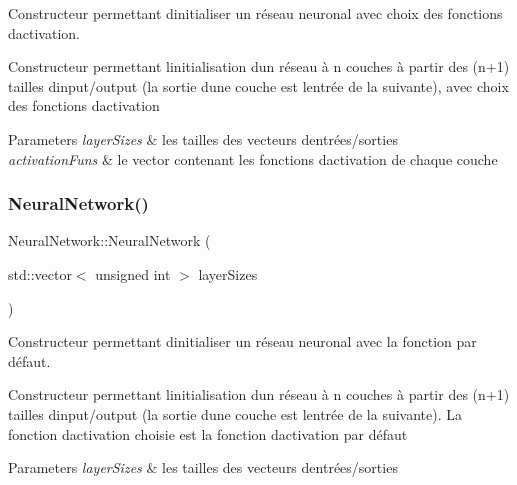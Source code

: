 Constructeur permettant d\textquotesingle{}initialiser un réseau neuronal avec choix des fonctions d\textquotesingle{}activation. 

Constructeur permettant l\textquotesingle{}initialisation d\textquotesingle{}un réseau à n couches à partir des (n+1) tailles d\textquotesingle{}input/output (la sortie d\textquotesingle{}une couche est l\textquotesingle{}entrée de la suivante), avec choix des fonctions d\textquotesingle{}activation 
\begin{DoxyParams}{Parameters}
{\em layer\+Sizes} & les tailles des vecteurs d\textquotesingle{}entrées/sorties \\
\hline
{\em activation\+Funs} & le vector contenant les fonctions d\textquotesingle{}activation de chaque couche \\
\hline
\end{DoxyParams}
\mbox{\label{classNeuralNetwork_ab4015471a72a3d00b6bcabf156526f7b}} 
\subsubsection{\texorpdfstring{Neural\+Network()}{NeuralNetwork()}\hspace{0.1cm}{\footnotesize\ttfamily [3/4]}}
{\footnotesize\ttfamily Neural\+Network\+::\+Neural\+Network (\begin{DoxyParamCaption}\item[{std\+::vector$<$ unsigned int $>$}]{layer\+Sizes }\end{DoxyParamCaption})}



Constructeur permettant d\textquotesingle{}initialiser un réseau neuronal avec la fonction par défaut. 

Constructeur permettant l\textquotesingle{}initialisation d\textquotesingle{}un réseau à n couches à partir des (n+1) tailles d\textquotesingle{}input/output (la sortie d\textquotesingle{}une couche est l\textquotesingle{}entrée de la suivante). La fonction d\textquotesingle{}activation choisie est la fonction d\textquotesingle{}activation par défaut 
\begin{DoxyParams}{Parameters}
{\em layer\+Sizes} & les tailles des vecteurs d\textquotesingle{}entrées/sorties \\
\hline
\end{DoxyParams}
\mbox{\label{classNeuralNetwork_a7943bb4e9cb96aae048b236d4f1dd979}} 
